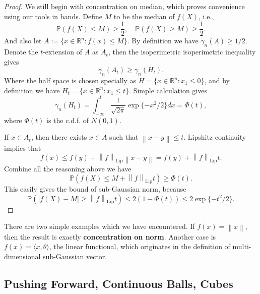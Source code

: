 \documentclass[9pt,onesided]{article}
\newcommand{\ip}[2]{\langle #1,#2 \rangle}
\newcommand{\nm}[1]{\left\lVert#1\right\rVert}
\newcommand{\re}{\mathbb{R}}
\renewcommand{\ge}{\geqslant}
\renewcommand{\le}{\leqslant}
\newcommand{\p}{\mathbb{P}}
\theoremstyle{definition}
\begin{document}
\begin{proof}
    We still begin with concentration on median, which proves convenience using our tools in hands. Define $M$ to be the median of $f(X)$, i.e.,
    \begin{equation*}
        \p(f(X)\le M)\ge \frac{1}{2}, \quad \p(f(X)\ge M)\ge \frac{1}{2}.
    \end{equation*}
    And also let $A:= \{x\in \re^n:f(x)\le M\}$. By definition we have $\gamma_n(A)\ge 1/2$. Denote the $t$-extension of $A$ as $A_t$, then the isoperimetric isoperimetric inequality gives
    \begin{equation*}
        \gamma_n(A_t)\ge \gamma_n(H_t).
    \end{equation*}
    Where the half space is chosen specially as $H=\{x\in \re^n: x_1\le0\}$, and by definition we have $H_t= \{x\in \re^n: x_1\le t\}$. Simple calculation gives 
    \begin{equation*}
         \gamma_n (H_t)=\int_{-\infty}^t \frac{1}{\sqrt{2\pi }} \exp\{-x^2 /2\}dx = \Phi(t),
    \end{equation*}
    where $\Phi(t)$ is the c.d.f. of $N(0,1)$. 

    If $x\in A_t$, then there exists $x\in A$ such that $\nm{x-y}\le t$. Lipshitz continuity implies that
    \begin{equation*}
         f(x)\le f(y)+\nm{f}_{\mathrm{Lip}} \nm{ x-y}= f(y)+\nm{f}_{ \mathrm{Lip}}t. 
    \end{equation*}
    Combine all the reasoning above we have
    \begin{equation*}
         \p( f(X)\le M+\nm{f}_{\mathrm{Lip}}t) \ge \Phi(t).
    \end{equation*}
    This easily gives the bound of sub-Gaussian norm, because 
    \begin{equation*}
         \p(|f(X)-M|\ge \nm{f}_{\mathrm{Lip}}t)\le 2 (1-\Phi(t))\le 2\exp \{ -t^2/2 \}.
    \end{equation*}
\end{proof}

There are two simple examples which we have encountered. If $f(x)=\nm{x}$, then the result is exactly \textbf{concentration on norm}. Another case is $f(x)=\ip{x}{\theta}$, the linear functional, which originates in the definition of multi-dimensional sub-Gaussian vector. 

 \subsection{Pushing Forward, Continuous Balls, Cubes}
\end{document}
